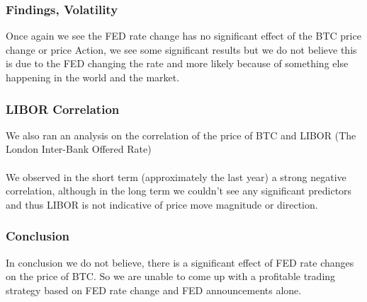 \documentclass{beamer}
\begin{document}
\begin{frame}
    \frametitle{Findings, Volatility}
Once again we see the FED rate change has no significant effect of the BTC price change or price Action, we see some significant results but we do not believe this is due to the FED changing the rate and more likely because of something else happening in the world and the market.
\end{frame}

\begin{frame}
    \frametitle{LIBOR Correlation}
    We also ran an analysis on the correlation of the price of BTC and LIBOR (The London Inter-Bank Offered Rate)
    \\
\\
We observed in the short term (approximately the last year) a strong negative correlation, although in the long term we couldn't see any significant predictors and thus LIBOR is not indicative of price move magnitude or direction.
\end{frame}

\begin{frame}
    \frametitle{Conclusion}
    In conclusion we do not believe, there is a significant effect of FED rate changes on the price of BTC. So we are unable to come up with a profitable trading strategy based on FED rate change and FED announcements alone. 
\end{frame}
\end{document}
